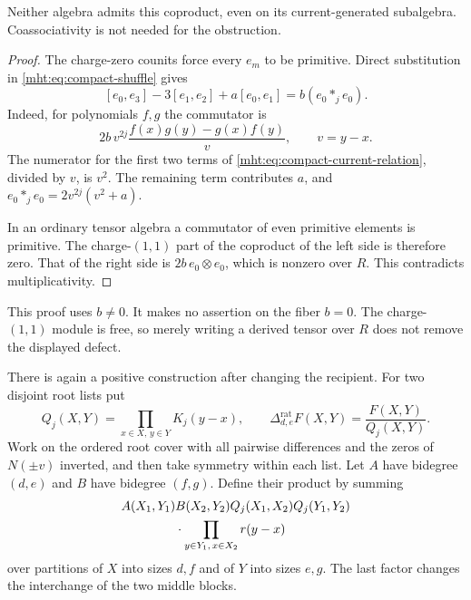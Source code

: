 \begin{proposition}\label{mht:prop:compact-ordinary-cooperation}
Neither algebra admits this coproduct, even on its current-generated
subalgebra. Coassociativity is not needed for the obstruction.
\end{proposition}

\begin{proof}
The charge-zero counits force every $e_m$ to be primitive. Direct
substitution in \eqref{mht:eq:compact-shuffle} gives
\begin{equation}\label{mht:eq:compact-current-relation}
 [e_0,e_3]-3[e_1,e_2]+a[e_0,e_1]=b(e_0*_je_0).
\end{equation}
Indeed, for polynomials $f,g$ the commutator is
\[
 2b\,v^{2j}\frac{f(x)g(y)-g(x)f(y)}{v},\qquad v=y-x.
\]
The numerator for the first two terms of
\eqref{mht:eq:compact-current-relation}, divided by $v$, is $v^2$.
The remaining term contributes $a$, and
$e_0*_je_0=2v^{2j}(v^2+a)$.

In an ordinary tensor algebra a commutator of even primitive elements
is primitive. The charge-$(1,1)$ part of the coproduct of the left
side is therefore zero. That of the right side is
$2b\,e_0\otimes e_0$, which is nonzero over $R$.
This contradicts multiplicativity.
\end{proof}

This proof uses $b\ne0$. It makes no assertion on the fiber $b=0$.
The charge-$(1,1)$ module is free, so merely writing a derived tensor
over $R$ does not remove the displayed defect.

There is again a positive construction after changing the recipient.
For two disjoint root lists put
\[
 Q_j(X,Y)=\prod_{x\in X,\,y\in Y}K_j(y-x),\qquad
 \Delta_{d,e}^{\mathrm{rat}}F(X,Y)=\frac{F(X,Y)}{Q_j(X,Y)}.
\]
Work on the ordered root cover with all pairwise differences and the
zeros of $N(\pm v)$ inverted, and then take symmetry within each
list. Let $A$ have bidegree $(d,e)$ and $B$ have bidegree $(f,g)$.
Define their product by summing
\begin{equation}\label{mht:eq:compact-rational-tensor}
 \begin{split}
 &A(X_1,Y_1)B(X_2,Y_2)
 Q_j(X_1,X_2)Q_j(Y_1,Y_2)\\
 &\hspace{15mm}\cdot
   \prod_{y\in Y_1,\,x\in X_2}r(y-x)
 \end{split}
\end{equation}
over partitions of $X$ into sizes $d,f$ and of $Y$ into sizes $e,g$.
The last factor changes the interchange of the two middle blocks.


